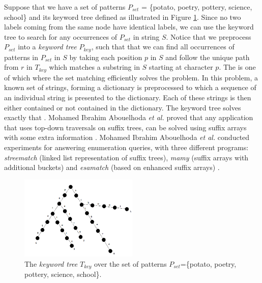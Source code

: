 \documentclass[12pt]{article} %
\begin{document}
Suppose that we have a set of patterns $P_{set}$ = \{potato, poetry, pottery, science, school\} and its keyword tree defined as illustrated in Figure \ref{fig:KeywordTree}. Since no two labels coming from the same node have identical labels, we can use the keyword tree to search for any occurrences of $P_{set}$ in string $S$. Notice that we preprocess $P_{set}$ into a \emph{keyword tree} $P_{key}$, such that that we can find all occurrences of patterns in $P_{set}$ in $S$ by taking each position $p$ in $S$ and follow the unique path from $r$ in $T_{key}$ which matches a substring in $S$ starting at character $p$. The  is one of which where the set matching efficiently solves the problem. In this problem, a known set of strings, forming a dictionary is preprocessed to which a sequence of an individual string is presented to the dictionary. Each of these strings is then either contained or not contained in the dictionary. The keyword tree solves exactly that \cite{gusfield}. Mohamed Ibrahim Abouelhoda \emph{et al.} \cite{enchancedsuffix} proved that any application that uses top-down traversals on suffix trees, can be solved using suffix arrays with some extra information \cite{enchancedsuffix}. Mohamed Ibrahim Abouelhoda \emph{et al.} conducted experiments for answering enumeration queries, with three different programs: \emph{streematch} (linked list representation of suffix trees), \emph{mamy} (suffix arrays with additional buckets) and \emph{esamatch} (based on enhanced suffix arrays) \cite{enchancedsuffix}.
\begin{figure}[H]
    \centering
    \includegraphics[width=0.5\textwidth]{KeywordTree}
    \captionsetup{width=0.8
    \textwidth}
    \caption{The \emph{keyword tree} $T_{key}$ over the set of patterns $P_{set}$=\{potato, poetry, pottery, science, school\}.}
    \label{fig:KeywordTree}
\end{figure}
\end{document}

